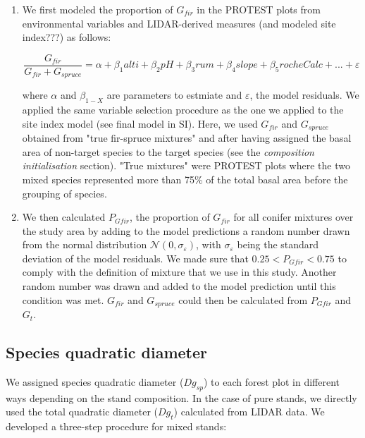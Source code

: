 \documentclass[a4paper]{article}
\begin{document}
\begin{enumerate}

  \item We first modeled the proportion of $G_{fir}$ in the PROTEST plots from environmental variables and LIDAR-derived measures (and modeled site index???) as follows:

  \begin{equation}\label{gfir-spruce}
    \frac{G_{fir}}{G_{fir} + G_{spruce}} = \alpha + \beta_1 alti + \beta_2 pH +\beta_3 rum +\beta_4 slope +\beta_5 rocheCalc+...+ \varepsilon
  \end{equation}

  \noindent where $\alpha$ and $\beta_{1-X}$ are parameters to estmiate and $\varepsilon$, the model residuals. We applied the same variable selection procedure as the one we applied to the site index model (see final model in SI). Here, we used $G_{fir}$ and $G_{spruce}$ obtained from "true fir-spruce mixtures" and after having assigned the basal area of non-target species to the target species (see the \textit{composition initialisation} section). "True mixtures" were PROTEST plots where the two mixed species represented more than 75\% of the total basal area before the grouping of species.

  \item We then calculated $P_{Gfir}$, the proportion of $G_{fir}$ for all conifer mixtures over the study area by adding to the model predictions a random number drawn from the normal distribution $\mathcal{N} (0, \sigma_\varepsilon)$, with $\sigma_\varepsilon$ being the standard deviation of the model residuals. We made sure that $0.25 < P_{Gfir} < 0.75$ to comply with the definition of mixture that we use in this study. Another random number was drawn and added to the model prediction until this condition was met. $G_{fir}$ and $G_{spruce}$ could then be calculated from $P_{Gfir}$ and $G_t$.

\end{enumerate}


\subsection*{Species quadratic diameter}\label{Dg}

We assigned species quadratic diameter ($Dg_{sp}$) to each forest plot in different ways depending on the stand composition. In the case of pure stands, we directly used the total quadratic diameter ($Dg_t$) calculated from LIDAR data. We developed a three-step procedure for mixed stands:
\end{document}
